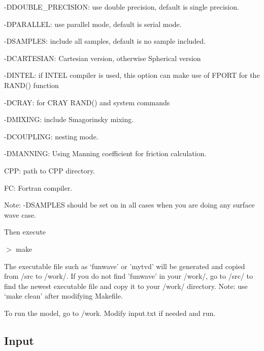 \documentclass[11pt]{article}
\begin{document}
\begin{description} 

\item -DDOUBLE\_PRECISION: use double precision, default is single precision.

\item -DPARALLEL: use parallel mode, default is serial mode.

\item -DSAMPLES: include all samples, default is no sample included.

\item -DCARTESIAN: Cartesian version, otherwise Spherical version

\item -DINTEL: if INTEL compiler is used, this option can make use of FPORT for the RAND() function

\item -DCRAY: for CRAY RAND() and system commands


\item -DMIXING: include Smagorinsky mixing. 

\item -DCOUPLING: nesting mode.

\item -DMANNING: Using Manning coefficient for friction calculation.


\item CPP: path to CPP directory.

\item FC: Fortran compiler. 

\end{description}

Note: -DSAMPLES should be set on in all cases when you are doing any surface wave case. 

Then execute 

$>$ make

\noindent
The executable file such as `funwave' or 'mytvd' will be generated and  copied from /src to /work/. If you do not find 'funwave' in your /work/, go to /src/ to find the newest executable file and copy it to your /work/ directory.  Note: use `make clean' after modifying Makefile.  

To run the model, go to /work. Modify input.txt if needed and run. 


\subsection{Input}
\end{document}
